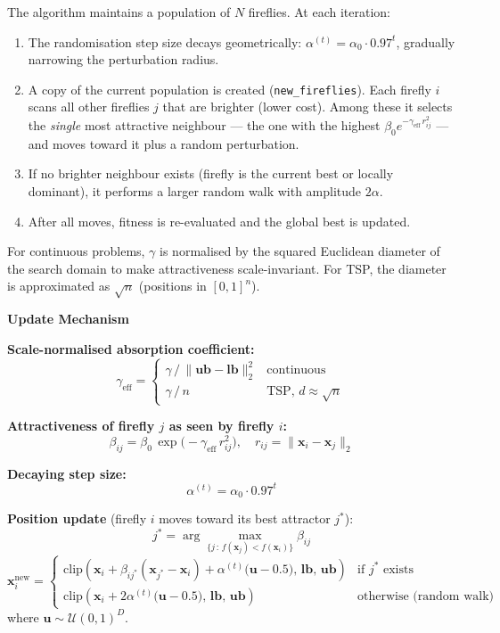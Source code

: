 The algorithm maintains a population of $N$ fireflies. At each iteration:
\begin{enumerate}
  \item The randomisation step size decays geometrically: $\alpha^{(t)} = \alpha_0 \cdot
        0.97^t$, gradually narrowing the perturbation radius.
  \item A copy of the current population is created (\texttt{new\_fireflies}). Each firefly
        $i$ scans all other fireflies $j$ that are brighter (lower cost). Among these it
        selects the \textit{single} most attractive neighbour --- the one with the highest
        $\beta_0 e^{-\gamma_{\text{eff}}\,r_{ij}^2}$ --- and moves toward it plus a random
        perturbation.
  \item If no brighter neighbour exists (firefly is the current best or locally dominant),
        it performs a larger random walk with amplitude $2\alpha$.
  \item After all moves, fitness is re-evaluated and the global best is updated.
\end{enumerate}
For continuous problems, $\gamma$ is normalised by the squared Euclidean diameter of the
search domain to make attractiveness scale-invariant. For TSP, the diameter is approximated as
$\sqrt{n}$ (positions in $[0,1]^n$).

\textbf{Update Mechanism}

\textbf{Scale-normalised absorption coefficient:}
\[
\gamma_{\text{eff}} =
\begin{cases}
\gamma\,/\,\|\mathbf{ub}-\mathbf{lb}\|_2^2 & \text{continuous}\\[4pt]
\gamma\,/\,n                               & \text{TSP, } d\approx\sqrt{n}
\end{cases}
\]

\textbf{Attractiveness of firefly $j$ as seen by firefly $i$:}
\[
\beta_{ij} = \beta_0\,\exp\!\bigl(-\gamma_{\text{eff}}\,r_{ij}^2\bigr),
\quad r_{ij} = \|\mathbf{x}_i - \mathbf{x}_j\|_2
\]

\textbf{Decaying step size:}
\[
\alpha^{(t)} = \alpha_0 \cdot 0.97^{t}
\]

\textbf{Position update} (firefly $i$ moves toward its best attractor $j^*$):
\[
j^* = \arg\max_{\{j\,:\,f(\mathbf{x}_j)<f(\mathbf{x}_i)\}}\beta_{ij}
\]
\[
\mathbf{x}_i^{\text{new}} =
\begin{cases}
\mathrm{clip}\!\left(\mathbf{x}_i + \beta_{ij^*}(\mathbf{x}_{j^*}-\mathbf{x}_i)
                     + \alpha^{(t)}\bigl(\mathbf{u}-0.5\bigr),\,\mathbf{lb},\,\mathbf{ub}\right)
  & \text{if } j^* \text{ exists}\\[6pt]
\mathrm{clip}\!\left(\mathbf{x}_i + 2\alpha^{(t)}\bigl(\mathbf{u}-0.5\bigr),\,
                     \mathbf{lb},\,\mathbf{ub}\right)
  & \text{otherwise (random walk)}
\end{cases}
\]
where $\mathbf{u}\sim\mathcal{U}(0,1)^D$.

